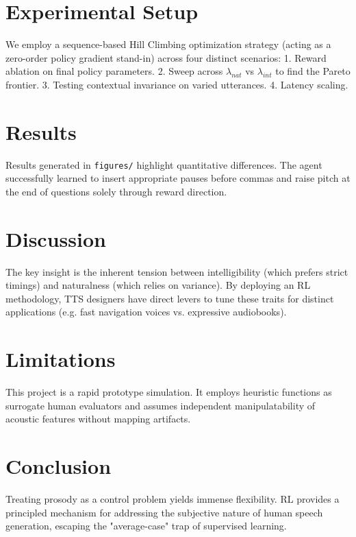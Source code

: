 \documentclass[11pt,a4paper]{article}
\begin{document}
\section{Experimental Setup}
We employ a sequence-based Hill Climbing optimization strategy (acting as a zero-order policy gradient stand-in) across four distinct scenarios:
1. Reward ablation on final policy parameters.
2. Sweep across $\lambda_{nat}$ vs $\lambda_{int}$ to find the Pareto frontier.
3. Testing contextual invariance on varied utterances.
4. Latency scaling.

\section{Results}
Results generated in \texttt{figures/} highlight quantitative differences. The agent successfully learned to insert appropriate pauses before commas and raise pitch at the end of questions solely through reward direction. 

\section{Discussion}
The key insight is the inherent tension between intelligibility (which prefers strict timings) and naturalness (which relies on variance). By deploying an RL methodology, TTS designers have direct levers to tune these traits for distinct applications (e.g. fast navigation voices vs. expressive audiobooks).

\section{Limitations}
This project is a rapid prototype simulation. It employs heuristic functions as surrogate human evaluators and assumes independent manipulatability of acoustic features without mapping artifacts.

\section{Conclusion}
Treating prosody as a control problem yields immense flexibility. RL provides a principled mechanism for addressing the subjective nature of human speech generation, escaping the "average-case" trap of supervised learning.
\end{document}

